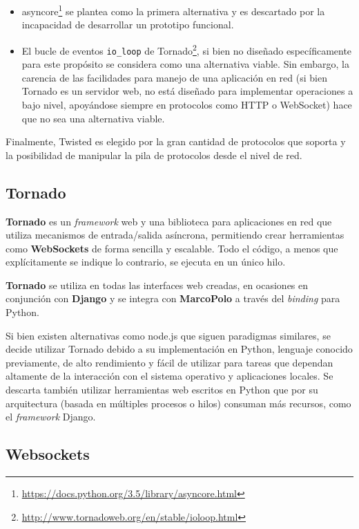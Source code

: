 \begin{itemize}
\item asyncore\footnote{\href{https://docs.python.org/3.5/library/asyncore.html}{https://docs.python.org/3.5/library/asyncore.html}} se plantea como la primera alternativa y es descartado por la incapacidad de desarrollar un prototipo funcional.
\item El bucle de eventos \texttt{io\_loop} de Tornado\footnote{\href{http://www.tornadoweb.org/en/stable/ioloop.html}{http://www.tornadoweb.org/en/stable/ioloop.html}}, si bien no diseñado específicamente para este propósito se considera como una alternativa viable. Sin embargo, la carencia de las facilidades para manejo de una aplicación en red (si bien Tornado es un servidor web, no está diseñado para implementar operaciones a bajo nivel, apoyándose siempre en protocolos como HTTP o WebSocket) hace que no sea una alternativa viable.
\end{itemize}

Finalmente, Twisted es elegido por la gran cantidad de protocolos que soporta y la posibilidad de manipular la pila de protocolos desde el nivel de red.

\subsection{Tornado}

\textbf{Tornado} es un \textit{framework} web y una biblioteca para aplicaciones en red que utiliza mecanismos de entrada/salida asíncrona, permitiendo crear herramientas como \textbf{WebSockets} de forma sencilla y escalable. Todo el código, a menos que explícitamente se indique lo contrario, se ejecuta en un único hilo.

\textbf{Tornado} se utiliza en todas las interfaces web creadas, en ocasiones en conjunción con \textbf{Django} y se integra con \textbf{MarcoPolo} a través del \textit{binding} para Python.

Si bien existen alternativas como node.js que siguen paradigmas similares, se decide utilizar Tornado debido a su implementación en Python, lenguaje conocido previamente, de alto rendimiento y fácil de utilizar para tareas que dependan altamente de la interacción con el sistema operativo y aplicaciones locales. Se descarta también utilizar herramientas web escritos en Python que por su arquitectura (basada en múltiples procesos o hilos) consuman más recursos, como el \textit{framework} Django.

\subsection{Websockets}

